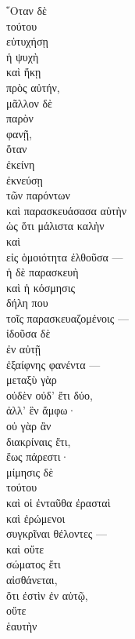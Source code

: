 {\large
\begin{greek}
\noindent ῞Οταν δὲ \\
\tabto{2em} τούτου \\
εὐτυχήσῃ \\
ἡ ψυχὴ \\
καὶ ἥκῃ \\
\tabto{2em} πρὸς αὐτήν, \\
μᾶλλον δὲ \\
παρὸν \\
φανῇ, \\
ὅταν \\
\tabto{2em} ἐκείνη \\
\tabto{2em} ἐκνεύσῃ \\
\tabto{4em} τῶν παρόντων \\
\tabto{2em} καὶ παρασκευάσασα αὑτὴν \\
\tabto{4em} ὡς ὅτι μάλιστα καλὴν \\
\tabto{2em} καὶ \\
\tabto{4em} εἰς ὁμοιότητα ἐλθοῦσα —\\
\tabto{4em} ἡ δὲ παρασκευὴ \\
\tabto{4em} καὶ ἡ κόσμησις \\
\tabto{4em} δήλη που \\
\tabto{6em} τοῖς παρασκευαζομένοις —\\
ἰδοῦσα δὲ \\
\tabto{2em} ἐν αὐτῇ \\
\tabto{2em} ἐξαίφνης φανέντα —\\
μεταξὺ γὰρ \\
\tabto{2em} οὐδὲν οὐδ' ἔτι δύο, \\
\tabto{2em} ἀλλ' ἓν ἄμφω· \\
οὐ γὰρ ἂν \\
\tabto{2em} διακρίναις ἔτι, \\
\tabto{2em} \tabto{2em} ἕως πάρεστι· \\
μίμησις δὲ \\
\tabto{2em} τούτου \\
καὶ οἱ ἐνταῦθα ἐρασταὶ \\
καὶ ἐρώμενοι \\
\tabto{2em} συγκρῖναι θέλοντες —\\
καὶ οὔτε \\
\tabto{2em} σώματος ἔτι \\
\tabto{2em} αἰσθάνεται, \\
\tabto{4em} \tabto{2em} ὅτι ἐστὶν ἐν αὐτῷ,  \\
οὔτε \\
\tabto{2em} ἑαυτὴν \\

\end{greek}}
